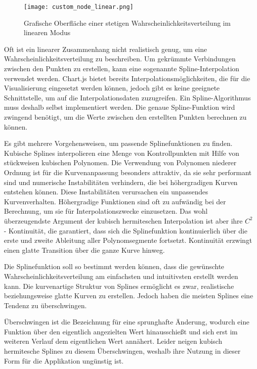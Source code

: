 \begin{figure}[H]
    \centering
    \texttt{[image: custom\_node\_linear.png]}
    \caption{Grafische Oberfläche einer stetigen Wahrscheinlichkeitsverteilung im linearen Modus}
    \label{fig:customnodelinear}
\end{figure}

Oft ist ein linearer Zusammenhang nicht realistisch genug, um eine Wahrscheinlichkeitsverteilung zu beschreiben. Um gekrümmte Verbindungen zwischen den Punkten zu erstellen, kann eine sogenannte Spline-Interpolation verwendet werden. Chart.js bietet bereits Interpolationsmöglichkeiten, die für die Visualisierung eingesetzt werden können, jedoch gibt es keine geeignete Schnittstelle, um auf die Interpolationsdaten zuzugreifen. Ein Spline-Algorithmus muss deshalb selbst implementiert werden. Die genaue Spline-Funktion wird zwingend benötigt, um die Werte zwischen den erstellten Punkten berechnen zu können.

Es gibt mehrere Vorgehensweisen, um passende Splinefunktionen zu finden. 
Kubische Splines interpolieren eine Menge von Kontrollpunkten mit Hilfe von
stückweisen kubischen Polynomen. Die Verwendung von Polynomen niederer Ordnung ist für die Kurvenanpassung besonders attraktiv, da sie sehr performant sind und numerische Instabilitäten verhindern, die bei höhergradigen Kurven entstehen können. Diese Instabilitäten verursachen ein unpassendes Kurvenverhalten. Höhergradige Funktionen sind oft zu aufwändig bei der Berechnung, um sie für Interpolationszwecke einzusetzen. Das wohl überzeugendste
Argument der kubisch hermiteschen Interpolation ist aber ihre $C^2$-
Kontinuität, die garantiert, dass sich die Splinefunktion kontinuierlich über die erste und zweite Ableitung aller Polynomsegmente fortsetzt.
Kontinuität erzwingt einen glatte Transition über die ganze Kurve hinweg. \cite{Wolberg1999}

Die Splinefunktion soll so bestimmt werden können, dass die gewünschte Wahrscheinlichkeitsverteilung am einfachsten und intuitivsten erstellt werden kann. Die kurvenartige Struktur von Splines ermöglicht es zwar, realistische beziehungsweise glatte Kurven zu erstellen. Jedoch haben die meisten Splines eine Tendenz zu überschwingen. 

Überschwingen ist die Bezeichnung für eine sprunghafte Änderung, wodurch eine Funktion über den eigentlich angezielten Wert hinausschießt und sich erst im weiteren Verlauf dem eigentlichen Wert annähert. Leider neigen kubisch hermitesche Splines zu diesem Überschwingen, weshalb ihre Nutzung in dieser Form für die Applikation ungünstig ist. \cite{kruger:2007}

